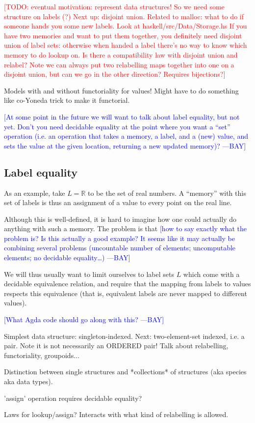 \documentclass{jfp}
\newcommand{\authornote}[3]{\textcolor{#1}{[#3 ---#2]}}
\newcommand{\todo}[1]{\textcolor{red}{[TODO: #1]}}
\newcommand{\authornote}[3]{}
\newcommand{\todo}[1]{}
\newcommand{\bay}[1]{\authornote{blue}{BAY}{#1}}
\begin{document}
\todo{eventual motivation: represent data structures!  So we need some
  structure on labels (?)  Next up: disjoint union.  Related to
  malloc: what to do if someone hands you some new labels.  Look at
  haskell/src/Data/Storage.hs If you have two memories and want to put
  them together, you definitely need disjoint union of label sets:
  otherwise when handed a label there's no way to know which memory to
  do lookup on.  Is there a compatibility law with disjoint union and
  relabel?  Note we can always put two relabelling maps together into
  one on a disjoint union, but can we go in the other direction?
  Requires bijections?}

\begin{commentary}
  Models with and without functoriality for values!  Might have to do
  something like co-Yoneda trick to make it functorial.
\end{commentary}

\bay{At some point in the future we will want to talk about label
  equality, but not yet.  Don't you need decidable equality at the
  point where you want a ``set'' operation (i.e. an operation that
  takes a memory, a label, and a (new) value, and sets the value at
  the given location, returning a new updated memory)?}

\subsection{Label equality}
\label{sec:label-equality}

As an example, take $L = \mathbb{R}$ to be the set of real numbers.
A ``memory'' with this set of labels is thus an assignment of a value
to every point on the real line.

Although this is well-defined, it is hard to imagine how one could
actually do anything with such a memory.  The problem is that
\bay{how to say exactly what the problem is?  Is this actually a good
  example?  It seems like it may actually be combining several
  problems (uncountable number of elements; uncomputable elements; no
  decidable equality\dots)}

We will thus usually want to limit ourselves to label sets $L$ which
come with a decidable equivalence relation, and require that the
mapping from labels to values respects this equivalence (that is,
equivalent labels are never mapped to different values).

\bay{What Agda code should go along with this?}


\begin{commentary}
  Simplest data structure: singleton-indexed.  Next: two-element-set
  indexed, i.e. a pair.  Note it is not necessarily an ORDERED pair!
  Talk about relabelling, functoriality, groupoids...

  Distinction between single structures and *collections* of
  structures (aka species aka data types).

  'assign' operation requires decidable equality?

  Laws for lookup/assign?  Interacts with what kind of relabelling is
  allowed.
\end{commentary}
\end{document}
